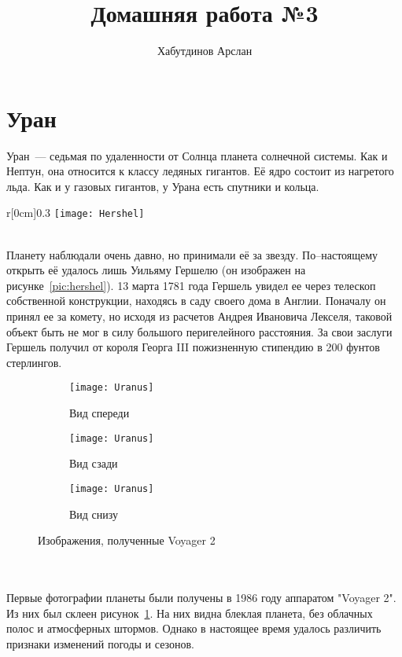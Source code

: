 \documentclass[30pt]{article}
\title{Домашняя работа №3}
\author{Хабутдинов Арслан}
\date{}
\begin{document}
    \section{Уран}
        Уран~--- седьмая по удаленности от Солнца планета солнечной системы. Как и Нептун, она относится к классу ледяных гигантов. Её ядро состоит из нагретого льда. Как и у газовых гигантов, у Урана есть спутники и кольца. 
        \begin{wrapfigure}[13]{r}[0cm]{0.3\textwidth} 
            \texttt{[image: Hershel]}
            \centering
            \caption{У. Гершель}
            \label{pic:hershel}
        \end{wrapfigure}\\
        Планету наблюдали очень давно, но принимали её за звезду. По--настоящему открыть её удалось лишь Уильяму Гершелю (он изображен на рисунке~\ref{pic:hershel}). 13 марта 1781 года Гершель увидел ее через телескоп собственной конструкции, находясь в саду своего дома в Англии. Поначалу он принял ее за комету, но исходя из расчетов Андрея Ивановича Лекселя, таковой объект быть не мог в силу большого перигелейного расстояния. За свои заслуги Гершель получил от короля Георга III пожизненную стипендию в 200 фунтов стерлингов.
        \begin{figure}[h!]
            \centering
            \begin{subfigure}[b]{0.30\textwidth}
                \texttt{[image: Uranus]}
                \caption{Вид спереди}
            \end{subfigure}
            \begin{subfigure}[b]{0.30\textwidth}
                \texttt{[image: Uranus]}
                \caption{Вид сзади}
            \end{subfigure}
            \begin{subfigure}[b]{0.30\textwidth}
                \texttt{[image: Uranus]}
                \caption{Вид снизу}
            \end{subfigure}
            \caption{Изображения, полученные Voyager 2}
            \label{pic:planet}
        \end{figure}\\\\
        Первые фотографии планеты были получены в 1986 году аппаратом "Voyager 2". Из них был склеен рисунок~\ref{pic:planet}. На них видна блеклая планета, без облачных полос и атмосферных штормов. Однако в настоящее время удалось различить признаки изменений погоды и сезонов. 
\end{document}
